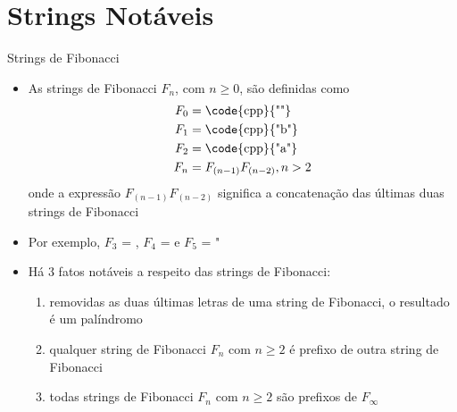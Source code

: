 \section{Strings Notáveis}

\begin{frame}[fragile]{Strings de Fibonacci}

    \begin{itemize}
        \item As strings de Fibonacci $F_n$, com $n \geq 0$, são definidas como
        \begin{align*}
            F_0 &= \mbox{\code{cpp}{""}} \\
            F_1 &= \mbox{\code{cpp}{"b"}} \\
            F_2 &=  \mbox{\code{cpp}{"a"}} \\
            F_n &= F_{(n-1)}F_{(n-2)}, n > 2
            \end{align*}
        onde a expressão $F_{(n-1)}F_{(n-2)}$ significa a concatenação das últimas duas strings de 
        Fibonacci
        \pause

        \item Por exemplo, $F_3$ = , $F_4$ =   e $F_5$ = "
        \pause

        \item Há 3 fatos notáveis a respeito das strings de Fibonacci:
        \pause
        \begin{enumerate}
            \item removidas as duas últimas letras de uma string de Fibonacci, o resultado é um 
                palíndromo
        \pause
            \item qualquer string de Fibonacci $F_n$ com $n\geq 2$ é prefixo de outra string de Fibonacci
        \pause
            \item todas strings de Fibonacci $F_n$ com $n\geq 2$ são prefixos de $F_\infty$
        \end{enumerate}

    \end{itemize}

\end{frame}


